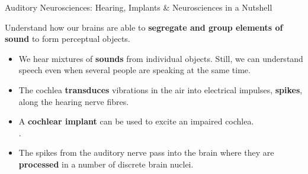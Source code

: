 \documentclass[paperwidth=75cm,paperheight=116.18cm,fontscale=0.40]{baposter}
\begin{document}
\begin{poster}
\begin{posterbox}[name=auditoryNeuro,column=1, span=2,row=0,headerColorOne=red!40!black,headerColorTwo=red!75!white,borderColor=red!50!white, textborder=roundedsmall]{ Auditory Neurosciences: \small{Hearing, Implants \&  Neurosciences in a Nutshell}} 
	\noindent\begin{minipage}{10.6cm}
		\vspace*{-1mm}
		\begin{tcolorbox}[colback=red!0!white,colframe=red!90!white,title=\LARGE{\textsc{Our ultimate goal is to}}] 
			\hspace{-4.0mm}
			\begin{minipage}{10.2cm}
			\large
			 {Understand how our brains are able to \textbf{segregate and group elements of sound}  
			to form perceptual objects.}
			\end{minipage}
		\end{tcolorbox} 
		\vspace*{-1.42mm}\noindent\begin{itemize}%
			\item[\ccircled{1}] We hear mixtures of \textbf{sounds} from individual objects. 
						Still, we can understand speech even when several people are speaking at the same time. %
				\\[\spaceItem]
			\item[\ccircled{2}] The cochlea \textbf{transduces} vibrations in the air into electrical impulses, \textbf{spikes}, along the hearing nerve fibres. 
			    	\\[\spaceItem]
			\item[\ccircled{3}]  A \textbf{cochlear implant} can be used to excite an impaired cochlea.
				\\[\spaceItem].
			\item[\ccircled{4}]  The spikes from the auditory nerve pass into the brain where they are \textbf{processed} in a number of discrete brain nuclei.

\end{itemize}
\end{minipage}
\end{posterbox}
\end{poster}
\end{document}
